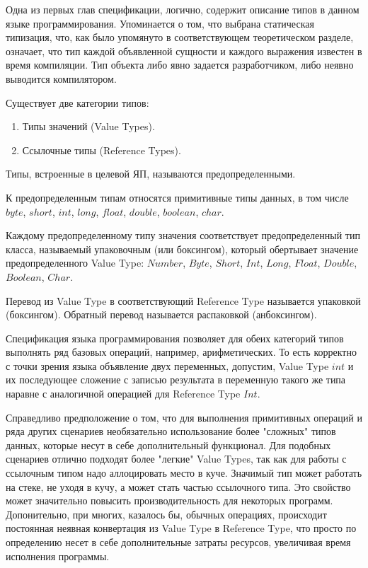 \documentclass{mipt-thesis-bs}
\begin{document}
Одна из первых глав спецификации, логично, содержит описание типов в данном языке 
программирования. Упоминается о том, что выбрана статическая типизация, что, как 
было упомянуто в соответствующем теоретическом разделе, означает, что тип 
каждой объявленной сущности и каждого выражения известен в
время компиляции. Тип объекта либо явно задается разработчиком, 
либо неявно выводится компилятором.

Существует две категории типов:
\begin{enumerate}
    \item Типы значений (Value Types).
    \item Ссылочные типы (Reference Types).
\end{enumerate}

Типы, встроенные в целевой ЯП, называются предопределенными.

К предопределенным типам относятся примитивные типы данных, в том числе 
$byte$, $short$, $int$, $long$, $float$, $double$, $boolean$, $char$.

Каждому предопределенному типу значения соответствует 
предопределенный тип класса, называемый 
упаковочным (или боксингом), который обертывает значение предопределенного 
Value Type: $Number$, $Byte$, $Short$, $Int$, $Long$, $Float$, $Double$, $Boolean$, $Char$.

Перевод из Value Type в соответствующий Reference Type называется упаковкой
(боксингом). Обратный перевод называется распаковкой (анбоксингом).

Спецификация языка программирования позволяет для обеих категорий типов выполнять ряд
базовых операций, например, арифметических. То есть корректно с точки зрения языка
объявление двух переменных, допустим, Value Type $int$ и их последующее сложение с записью
результата в переменную такого же типа наравне с аналогичной операцией для Reference Type $Int$.

Справедливо предположение о том, что для выполнения примитивных операций и ряда других
сценариев необязательно использование более "сложных" типов данных, которые несут 
в себе дополнительный функционал.
Для подобных сценариев отлично подходят более "легкие" Value Types, так как для работы 
с ссылочным типом надо аллоцировать место в куче. Значимый тип может работать на 
стеке, не уходя в кучу, а может стать частью ссылочного типа. 
Это свойство может значительно повысить производительность для некоторых программ.
Допонительно, при многих, казалось бы, обычных операциях, происходит постоянная неявная
конвертация из Value Type в Reference Type, что просто по определению несет в себе 
дополнительные затраты ресурсов, увеличивая время исполнения программы.
\end{document}
